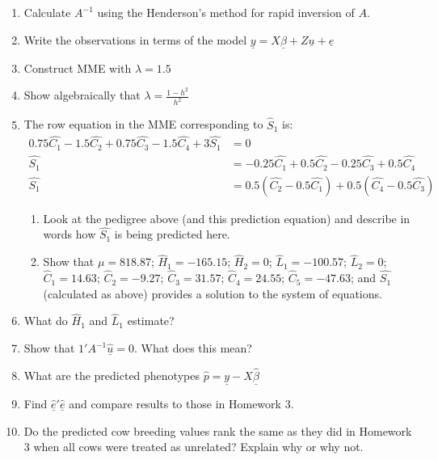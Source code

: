 \documentclass[12pt,a4paper]{paper}
\begin{document}
\begin{enumerate}[resume]
\item Calculate $A^{-1}$ using the Henderson's method for rapid inversion of $A$.
\item Write the observations in terms of the model $\underline{y} = X\underline{\beta}+Z\underline{u}+\underline{e}$
\item Construct MME with $\lambda = 1.5$
\item Show algebraically that $\lambda = \frac{1-h^{2}}{h^{2}}$
\item The row equation in the MME corresponding to $\hat{S}_{1}$ is:
\begin{equation*}
\begin{split}
0.75\hat{C_{1}} - 1.5\hat{C_{2}} + 0.75\hat{C_{3}} - 1.5\hat{C_{4}} + 3\hat{S_{1}} &= 0 \\
\hat{S_{1}} &= -0.25\hat{C_{1}} + 0.5\hat{C_{2}} - 0.25\hat{C_{3}} + 0.5\hat{C_{4}}\\
\hat{S_{1}} &= 0.5\left(\hat{C_{2}} - 0.5 \hat{C_{1}}\right) + 0.5\left(\hat{C_{4}} - 0.5 \hat{C_{3}}\right)
\end{split}
\end{equation*}
\begin{enumerate}
\item Look at the pedigree above (and this prediction equation) and describe in words how $\hat{S_{1}}$ is being predicted here.
\item Show that $\mu = 818.87$; $\hat{H}_{1}=-165.15$; $\hat{H}_{2} = 0$; $\hat{L}_{1}=-100.57$; $\hat{L}_{2}=0$; $\hat{C}_{1}=14.63$; $\hat{C}_{2}=-9.27$; $\hat{C}_{3}=31.57$; $\hat{C}_{4}=24.55$; $\hat{C}_{5}=-47.63$; and $\hat{S_{1}}$ (calculated as above) provides a solution to the system of equations.
\end{enumerate}
\item What do $\hat{H}_{1}$ and $\hat{L}_{1}$ estimate?
\item Show that $1'A^{-1}\hat{\underline{u}}=0$. What does this mean?
\item What are the predicted phenotypes $\hat{p} = \underline{y} - X\underline{\hat{\beta}}$
\item Find $\underline{\hat{e}}'\underline{\hat{e}}$ and compare results to those in Homework 3.
\item Do the predicted cow breeding values rank the same as they did in Homework 3 when all cows were treated as unrelated? Explain why or why not.
\end{enumerate}
\end{document}
